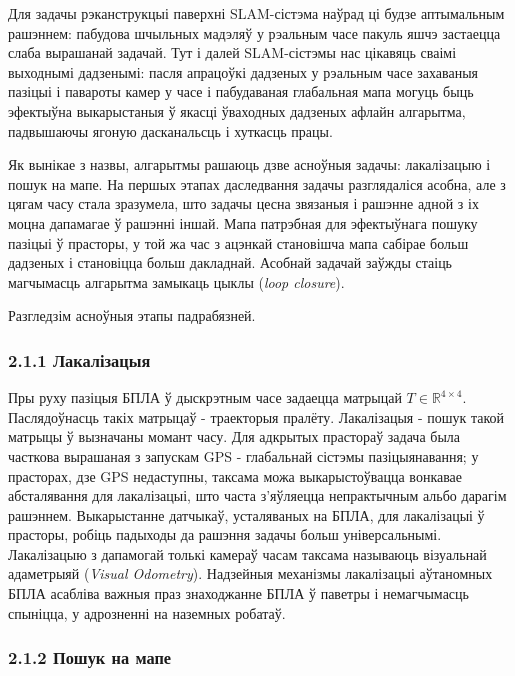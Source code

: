 Для задачы рэканструкцыі паверхні SLAM-сістэма наўрад ці будзе
аптымальным рашэннем: пабудова шчыльных мадэляў у рэальным часе пакуль яшчэ застаецца
слаба вырашанай задачай. Тут і далей SLAM-сістэмы нас цікавяць сваімі выходнымі
дадзенымі: пасля апрацоўкі дадзеных у рэальным часе захаваныя пазіцыі і павароты камер
у часе і пабудаваная глабальная мапа могуць быць эфектыўна выкарыстаныя ў якасці
ўваходных дадзеных афлайн алгарытма, падвышаючы ягоную дасканальсць і хуткасць працы.

Як вынікае з назвы, алгарытмы рашаюць дзве асноўныя задачы: лакалізацыю і пошук на мапе.
На першых этапах даследвання задачы разглядаліся асобна, але з цягам часу стала зразумела,
што задачы цесна звязаныя і рашэнне адной з іх моцна дапамагае ў рашэнні іншай. Мапа патрэбная для
эфектыўнага пошуку пазіцыі ў прасторы, у той жа час з ацэнкай становішча мапа сабірае больш дадзеных
і становіцца больш дакладнай. Асобнай задачай заўжды стаіць магчымасць алгарытма
замыкаць цыклы (\textit{loop closure}).

Разгледзім асноўныя этапы падрабязней.

\subsubsection*{2.1.1 Лакалізацыя}

Пры руху пазіцыя БПЛА ў дыскрэтным часе задаецца матрыцай $T \in \mathbb{R}^{4\times4}$.
Паслядоўнасць такіх матрыцаў - траекторыя пралёту. Лакалізацыя - пошук такой матрыцы ў вызначаны момант часу.
Для адкрытых прастораў задача была часткова вырашаная з запускам GPS - глабальнай сістэмы
пазіцыянавання; у прасторах, дзе GPS недаступны, таксама можа выкарыстоўвацца вонкавае
абсталявання для лакалізацыі, што часта з'яўляецца непрактычным альбо дарагім рашэннем.
Выкарыстанне датчыкаў, усталяваных на БПЛА, для лакалізацыі ў прасторы, робіць падыходы
да рашэння задачы больш універсальнымі. Лакалізацыю з дапамогай толькі камераў часам
таксама называюць візуальнай адаметрыяй (\textit{Visual Odometry}). Надзейныя механізмы
лакалізацыі аўтаномных БПЛА асабліва важныя праз знаходжанне БПЛА ў паветры і
немагчымасць спыніцца, у адрозненні на наземных робатаў.

\subsubsection*{2.1.2 Пошук на мапе}

